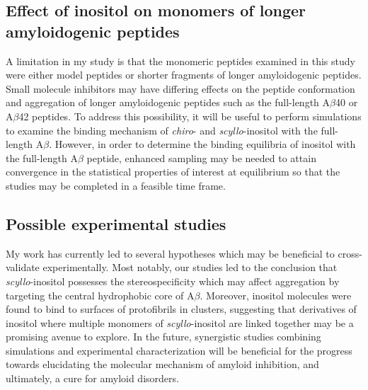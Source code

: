 \subsection{Effect of inositol on monomers of longer amyloidogenic peptides}
A limitation in my study is that the monomeric peptides examined in this study were either model peptides or shorter fragments of longer amyloidogenic peptides. Small molecule inhibitors may have differing effects on the peptide conformation and aggregation of longer amyloidogenic peptides such as the full-length A$\beta$40 or A$\beta$42 peptides. To address this possibility, it will be useful to perform simulations to examine the binding mechanism of \textit{chiro}- and \textit{scyllo}-inositol with the full-length A$\beta$. However, in order to determine the binding equilibria of inositol with  the full-length A$\beta$ peptide, enhanced sampling may be needed to attain convergence in the statistical properties of interest at equilibrium so that the studies may be completed in a feasible time frame.

\subsection{Possible experimental studies}
My work has currently led to several hypotheses which may be beneficial to cross-validate experimentally. Most notably, our studies led to the conclusion that \textit{scyllo}-inositol possesses the stereospecificity which may affect aggregation by targeting the central hydrophobic core of A$\beta$.  Moreover, inositol molecules were found to bind to surfaces of protofibrils in clusters, suggesting that derivatives of inositol where multiple monomers of \textit{scyllo}-inositol are linked together may be a promising avenue to explore. In the future, synergistic studies combining simulations and experimental characterization will be beneficial for the progress towards elucidating the molecular mechanism of amyloid inhibition, and ultimately, a cure for amyloid disorders.


